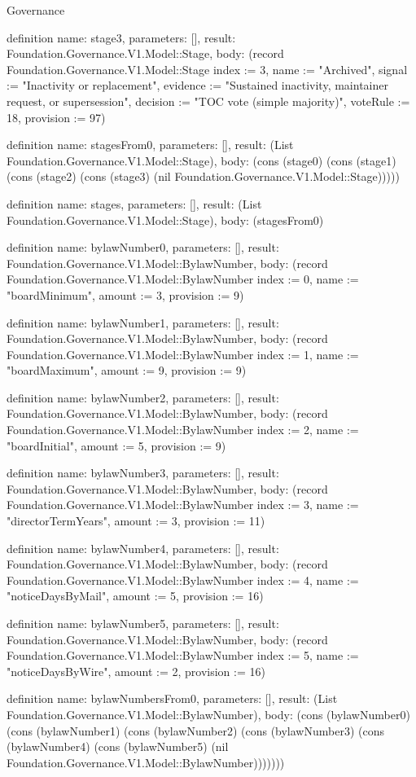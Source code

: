 \begin{lexlean}{Governance}
\begin{semanticmodule}
definition{
  name: stage3,
  parameters: [],
  result: Foundation.Governance.V1.Model::Stage,
  body: (record Foundation.Governance.V1.Model::Stage {index := 3, name := "Archived", signal := "Inactivity or replacement", evidence := "Sustained inactivity, maintainer request, or supersession", decision := "TOC vote (simple majority)", voteRule := 18, provision := 97})
}

definition{
  name: stagesFrom0,
  parameters: [],
  result: (List Foundation.Governance.V1.Model::Stage),
  body: (cons (stage0) (cons (stage1) (cons (stage2) (cons (stage3) (nil Foundation.Governance.V1.Model::Stage)))))
}

definition{
  name: stages,
  parameters: [],
  result: (List Foundation.Governance.V1.Model::Stage),
  body: (stagesFrom0)
}

definition{
  name: bylawNumber0,
  parameters: [],
  result: Foundation.Governance.V1.Model::BylawNumber,
  body: (record Foundation.Governance.V1.Model::BylawNumber {index := 0, name := "boardMinimum", amount := 3, provision := 9})
}

definition{
  name: bylawNumber1,
  parameters: [],
  result: Foundation.Governance.V1.Model::BylawNumber,
  body: (record Foundation.Governance.V1.Model::BylawNumber {index := 1, name := "boardMaximum", amount := 9, provision := 9})
}

definition{
  name: bylawNumber2,
  parameters: [],
  result: Foundation.Governance.V1.Model::BylawNumber,
  body: (record Foundation.Governance.V1.Model::BylawNumber {index := 2, name := "boardInitial", amount := 5, provision := 9})
}

definition{
  name: bylawNumber3,
  parameters: [],
  result: Foundation.Governance.V1.Model::BylawNumber,
  body: (record Foundation.Governance.V1.Model::BylawNumber {index := 3, name := "directorTermYears", amount := 3, provision := 11})
}

definition{
  name: bylawNumber4,
  parameters: [],
  result: Foundation.Governance.V1.Model::BylawNumber,
  body: (record Foundation.Governance.V1.Model::BylawNumber {index := 4, name := "noticeDaysByMail", amount := 5, provision := 16})
}

definition{
  name: bylawNumber5,
  parameters: [],
  result: Foundation.Governance.V1.Model::BylawNumber,
  body: (record Foundation.Governance.V1.Model::BylawNumber {index := 5, name := "noticeDaysByWire", amount := 2, provision := 16})
}

definition{
  name: bylawNumbersFrom0,
  parameters: [],
  result: (List Foundation.Governance.V1.Model::BylawNumber),
  body: (cons (bylawNumber0) (cons (bylawNumber1) (cons (bylawNumber2) (cons (bylawNumber3) (cons (bylawNumber4) (cons (bylawNumber5) (nil Foundation.Governance.V1.Model::BylawNumber)))))))
}


\end{semanticmodule}
\end{lexlean}

